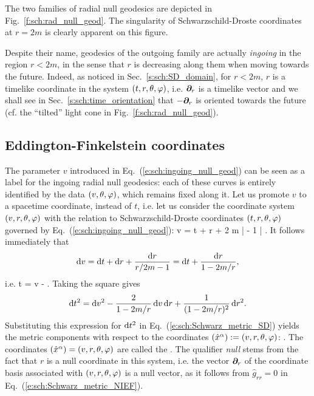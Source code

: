 The two families of radial null geodesics are depicted in
Fig.~\ref{f:sch:rad_null_geod}.
The singularity of Schwarzschild-Droste coordinates at $r=2m$
is clearly apparent on this figure.


\begin{remark}
Despite their name, geodesics of the outgoing family are actually
\emph{ingoing} in the region $r<2m$, in the sense that
$r$ is decreasing along them when moving towards the future. Indeed,
as noticed in Sec.~\ref{s:sch:SD_domain},
for $r<2m$, $r$ is a timelike coordinate in the system $(t,r,\theta,\varphi)$,
i.e. $\bm{\partial}_r$ is a timelike vector and we shall see in Sec.~\ref{s:sch:time_orientation}
that $-\bm{\partial}_r$ is oriented towards the future (cf. the ``tilted'' light cone
in Fig.~\ref{f:sch:rad_null_geod}).
\end{remark}

\subsection{Eddington-Finkelstein coordinates} \label{s:sch:EF_coord}

The parameter $v$ introduced in Eq.~(\ref{e:sch:ingoing_null_geod}) can be
seen as a label for the ingoing radial null geodesics: each of these curves is
entirely identified by the data $(v,\theta,\varphi)$, which remains fixed along it.
Let us promote $v$ to a spacetime coordinate, instead of $t$, i.e. let us
consider the coordinate system $(v,r,\theta,\varphi)$ with the relation to
Schwarzschild-Droste coordinates $(t,r,\theta,\varphi)$ governed by Eq.~(\ref{e:sch:ingoing_null_geod}):
\be \label{e:sch:v_t_r}
     v = t + r + 2 m \ln \left|  - 1 \right| .
\ee
It follows immediately that
\[
    \mathrm{d} v = \mathrm{d} t + \mathrm{d} r + \frac{\mathrm{d} r}{r/2m - 1} = \mathrm{d} t + \frac{\mathrm{d} r}{1 - 2m/r} ,
\]
i.e.
\be \label{e:sch:dt_dv_NIEF}
    \D t = \D v -   .
\ee
Taking the square gives
\[
    \mathrm{d} t^2 = \mathrm{d} v^2 - \frac{2}{1 - 2m/r} \, \mathrm{d} v \, \mathrm{d} r + \frac{1}{(1 - 2m/r)^2}\, \mathrm{d} r^2 .
\]
Substituting this expression for $\mathrm{d} t^2$ in Eq.~(\ref{e:sch:Schwarz_metric_SD})
yields the metric components with respect to the coordinates
$({\hat x}^\alpha) := (v,r,\theta,\varphi)$:
\be \label{e:sch:Schwarz_metric_NIEF}
    .
\ee
The coordinates $({\hat x}^\alpha) = (v,r,\theta,\varphi)$ are called the
. The qualifier \emph{null} stems from the fact that
$r$ is a null coordinate in this system, i.e. the vector $\bm{\partial}_r$ of the coordinate
basis associated with $(v,r,\theta,\varphi)$ is a null
vector, as it follows from ${\hat g}_{rr}=0$ in Eq.~(\ref{e:sch:Schwarz_metric_NIEF}).


